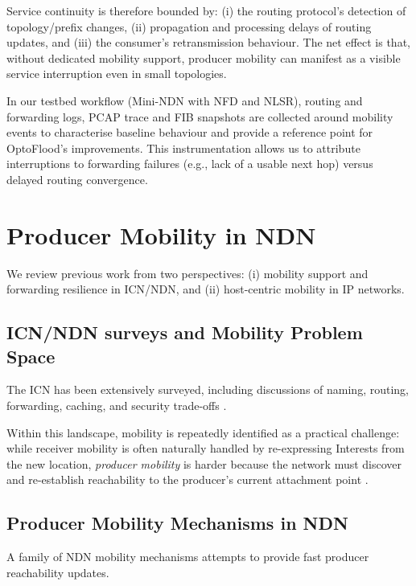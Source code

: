 Service continuity is therefore bounded by: (i) the routing protocol's detection of topology/prefix changes, (ii) propagation and processing delays of routing updates, and (iii) the consumer's retransmission behaviour. The net effect is that, without dedicated mobility support, producer mobility can manifest as a visible service interruption even in small topologies.

In our testbed workflow (Mini-NDN with NFD and NLSR), routing and forwarding logs, PCAP trace and FIB snapshots are collected around mobility events to characterise baseline behaviour and provide a reference point for OptoFlood’s improvements. This instrumentation allows us to attribute interruptions to forwarding failures (e.g., lack of a usable next hop) versus delayed routing convergence.


\section{Producer Mobility in NDN}
\label{sec:backgrpund:producer_mobility_in_ndn}

We review previous work from two perspectives: (i) mobility support and forwarding resilience in ICN/NDN, and (ii) host-centric mobility in IP networks.

\subsection{ICN/NDN surveys and Mobility Problem Space}
The ICN has been extensively surveyed, including discussions of naming, routing, forwarding, caching, and security trade-offs \cite{trossen:2012:icn-internet,xylomenos:2014:icn-survey,feng:2016:survey}.

Within this landscape, mobility is repeatedly identified as a practical challenge: while receiver mobility is often naturally handled by re-expressing Interests from the new location, \emph{producer mobility} is harder because the network must discover and re-establish reachability to the producer’s current attachment point \cite{tyson:2012:mobility-survey,zhang:2016:mobility-survey}.

\subsection{Producer Mobility Mechanisms in NDN}
A family of NDN mobility mechanisms attempts to provide fast producer reachability updates.

